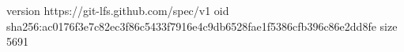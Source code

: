 version https://git-lfs.github.com/spec/v1
oid sha256:ac0176f3e7c82ec3f86c5433f7916e4c9db6528fae1f5386cfb396c86e2dd8fe
size 5691
